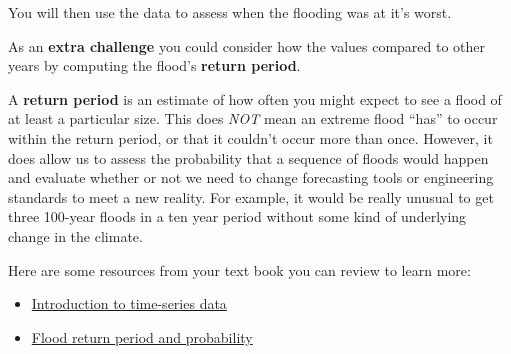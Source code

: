\documentclass[
  letterpaper,
  DIV=11,
  numbers=noendperiod,
  oneside]{scrreprt}
\providecommand{\tightlist}{%
  \setlength{\itemsep}{0pt}\setlength{\parskip}{0pt}}
\begin{document}
You will then use the data to assess when the flooding was at it's
worst.

As an \textbf{extra challenge} you could consider how the values
compared to other years by computing the flood's \textbf{return period}.

\begin{tcolorbox}[enhanced jigsaw, colbacktitle=quarto-callout-tip-color!10!white, opacityback=0, bottomtitle=1mm, toptitle=1mm, bottomrule=.15mm, left=2mm, colframe=quarto-callout-tip-color-frame, leftrule=.75mm, opacitybacktitle=0.6, colback=white, rightrule=.15mm, toprule=.15mm, breakable, titlerule=0mm, title=\textcolor{quarto-callout-tip-color}{\faLightbulb}\hspace{0.5em}{Tip}, coltitle=black, arc=.35mm]

A \textbf{return period} is an estimate of how often you might expect to
see a flood of at least a particular size. This does \emph{NOT} mean an
extreme flood ``has'' to occur within the return period, or that it
couldn't occur more than once. However, it does allow us to assess the
probability that a sequence of floods would happen and evaluate whether
or not we need to change forecasting tools or engineering standards to
meet a new reality. For example, it would be really unusual to get three
100-year floods in a ten year period without some kind of underlying
change in the climate.

\end{tcolorbox}

\begin{tcolorbox}[enhanced jigsaw, colbacktitle=quarto-callout-color!10!white, opacityback=0, bottomtitle=1mm, toptitle=1mm, bottomrule=.15mm, left=2mm, colframe=quarto-callout-color-frame, leftrule=.75mm, opacitybacktitle=0.6, colback=white, rightrule=.15mm, toprule=.15mm, breakable, titlerule=0mm, title=\textcolor{quarto-callout-color}{\faInfo}\hspace{0.5em}{Read More}, coltitle=black, arc=.35mm]

Here are some resources from your text book you can review to learn
more:

\begin{itemize}
\tightlist
\item
  \href{https://www.earthdatascience.org/courses/use-data-open-source-python/use-time-series-data-in-python/}{Introduction
  to time-series data}
\item
  \href{https://www.earthdatascience.org/courses/use-data-open-source-python/use-time-series-data-in-python/floods-return-period-and-probability/}{Flood
  return period and probability}
\end{itemize}

\end{tcolorbox}
\end{document}
